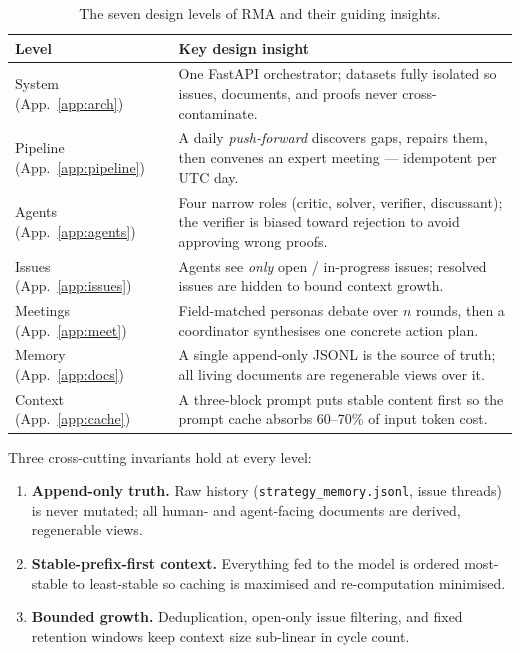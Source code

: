 \documentclass[11pt]{article}
\begin{document}
\begin{table}[h]
\centering
\small
\renewcommand{\arraystretch}{1.25}
\begin{tabularx}{\linewidth}{@{}lX@{}}
\toprule
\textbf{Level} & \textbf{Key design insight} \\
\midrule
System (App.~\ref{app:arch})
  & One FastAPI orchestrator; datasets fully isolated so issues, documents,
    and proofs never cross-contaminate. \\
Pipeline (App.~\ref{app:pipeline})
  & A daily \emph{push-forward} discovers gaps, repairs them, then convenes an
    expert meeting --- idempotent per UTC day. \\
Agents (App.~\ref{app:agents})
  & Four narrow roles (critic, solver, verifier, discussant); the verifier is
    biased toward rejection to avoid approving wrong proofs. \\
Issues (App.~\ref{app:issues})
  & Agents see \emph{only} open / in-progress issues; resolved issues are hidden
    to bound context growth. \\
Meetings (App.~\ref{app:meet})
  & Field-matched personas debate over $n$ rounds, then a coordinator
    synthesises one concrete action plan. \\
Memory (App.~\ref{app:docs})
  & A single append-only JSONL is the source of truth; all living documents are
    regenerable views over it. \\
Context (App.~\ref{app:cache})
  & A three-block prompt puts stable content first so the prompt cache absorbs
    60--70\% of input token cost. \\
\bottomrule
\end{tabularx}
\caption{The seven design levels of RMA and their guiding insights.}
\label{tab:overview}
\end{table}

\noindent
Three cross-cutting invariants hold at every level:
\begin{enumerate}[nosep,leftmargin=1.4em]
  \item \textbf{Append-only truth.} Raw history
    (\texttt{strategy\_memory.jsonl}, issue threads) is never mutated; all
    human- and agent-facing documents are derived, regenerable views.
  \item \textbf{Stable-prefix-first context.} Everything fed to the model is
    ordered most-stable to least-stable so caching is maximised and
    re-computation minimised.
  \item \textbf{Bounded growth.} Deduplication, open-only issue filtering, and
    fixed retention windows keep context size sub-linear in cycle count.
\end{enumerate}
\end{document}
